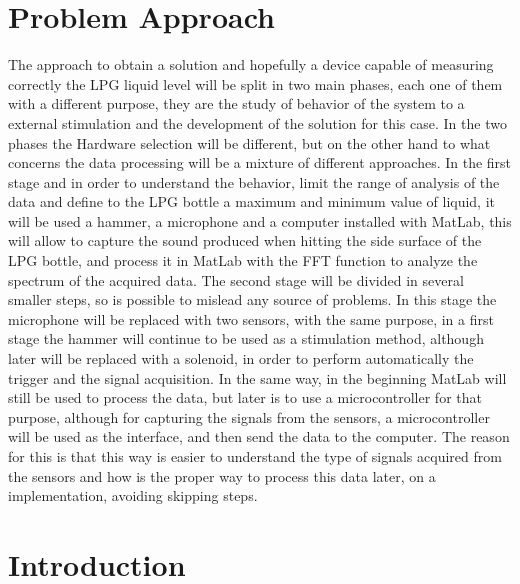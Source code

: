 \section{Problem Approach}
The approach to obtain a solution and hopefully a device capable of measuring correctly the LPG liquid level will be split in two main phases, each one of them with a different purpose, they are the study of behavior of the system to a external stimulation and the development of the solution for this case. In the two phases the Hardware selection will be different, but on the other hand to what concerns the data processing will be a mixture of different approaches.
In the first stage and in order to understand the behavior, limit the range of analysis of the data and define to the LPG bottle a maximum and minimum value of liquid, it will be used a hammer, a microphone and a computer installed with MatLab, this will allow to capture the sound produced when hitting the side surface of the LPG bottle, and process it in MatLab with the FFT function to analyze the spectrum of the acquired data.
The second stage will be divided in several smaller steps, so is possible to mislead any source of problems. In this stage the microphone will be replaced with two sensors, with the same purpose, in a first stage the hammer will continue to be used as a stimulation method, although later will be replaced with a solenoid, in order to perform automatically the trigger and the signal acquisition. In the same way, in the beginning MatLab will still be used to process the data, but later is to use a microcontroller for that purpose, although for capturing the signals from the sensors, a microcontroller will be used as the interface, and then send the data to the computer. The reason for this is that this way is easier to understand the type of signals acquired from the sensors and how is the proper way to process this data later, on a implementation, avoiding skipping steps.

\section{Introduction}
